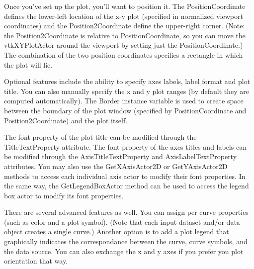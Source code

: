 Once you've set up the plot, you'll want to position it. The Position\-Coordinate defines the lower-\/left location of the x-\/y plot (specified in normalized viewport coordinates) and the Position2\-Coordinate define the upper-\/right corner. (Note\-: the Position2\-Coordinate is relative to Position\-Coordinate, so you can move the vtk\-X\-Y\-Plot\-Actor around the viewport by setting just the Position\-Coordinate.) The combination of the two position coordinates specifies a rectangle in which the plot will lie.

Optional features include the ability to specify axes labels, label format and plot title. You can also manually specify the x and y plot ranges (by default they are computed automatically). The Border instance variable is used to create space between the boundary of the plot window (specified by Position\-Coordinate and Position2\-Coordinate) and the plot itself.

The font property of the plot title can be modified through the Title\-Text\-Property attribute. The font property of the axes titles and labels can be modified through the Axis\-Title\-Text\-Property and Axis\-Label\-Text\-Property attributes. You may also use the Get\-X\-Axis\-Actor2\-D or Get\-Y\-Axis\-Actor2\-D methods to access each individual axis actor to modify their font properties. In the same way, the Get\-Legend\-Box\-Actor method can be used to access the legend box actor to modify its font properties.

There are several advanced features as well. You can assign per curve properties (such as color and a plot symbol). (Note that each input dataset and/or data object creates a single curve.) Another option is to add a plot legend that graphically indicates the correspondance between the curve, curve symbols, and the data source. You can also exchange the x and y axes if you prefer you plot orientation that way.


